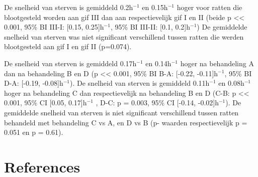 \documentclass[
  12pt,dutch]{book}
\theoremstyle{definition}
\theoremstyle{definition}
\theoremstyle{definition}
\theoremstyle{definition}
\theoremstyle{remark}
\begin{document}
De snelheid van sterven is gemiddeld 0.2h\(^{-1}\) en 0.15h\(^{-1}\) hoger voor ratten die blootgesteld worden aan gif III dan aan respectievelijk gif I en II (beide p \textless\textless{} 0.001, 95\% BI III-I: {[}0.15, 0.25{]}h\(^{-1}\), 95\% BI III-II: {[}0.1, 0.2{]}h\(^{-1}\))
De gemiddelde snelheid van sterven was niet significant verschillend tussen ratten die werden blootgesteld aan gif I en gif II (p=0.074).

De snelheid van sterven is gemiddeld 0.17h\(^{-1}\) en 0.14h\(^{-1}\) hoger na behandeling A dan na behandeling B en D (p \textless\textless{} 0.001, 95\% BI B-A: {[}-0.22, -0.11{]}h\(^{-1}\), 95\% BI D-A: {[}-0.19, -0.08{]}h\(^{-1}\)).
De snelheid van sterven is gemiddeld 0.11h\(^{-1}\) en 0.08h\(^{-1}\) hoger na behandeling C dan respectievelijk na behandeling B en D (C-B: p \textless\textless{} 0.001, 95\% CI {[}0.05, 0.17{]}h\(^{-1}\) , D-C: p = 0.003, 95\% CI {[}-0.14, -0.02{]}h\(^{-1}\)).
De gemiddelde snelheid van sterven is niet significant verschillend tussen ratten behandeld met behandeling C vs A, en D vs B (p- waarden respectievelijk p = 0.051 en p = 0.61).

\chapter{References}\label{references}


\end{document}
